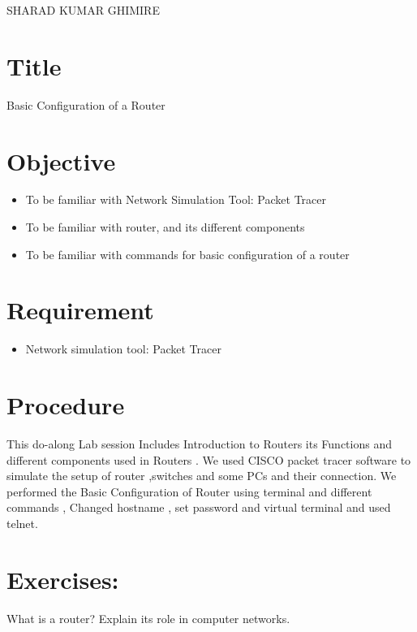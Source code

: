 \documentclass[12pt]{article}
\begin{document}
{SHARAD KUMAR GHIMIRE}

\renewcommand{\contentsname}{Table of Contents}
\tableofcontents

\pagebreak
\lstlistoflistings
\pagebreak
{}

\section{Title} {\large Basic Configuration of a Router}
\section{Objective}
\begin{itemize}
      \item To be familiar with Network Simulation Tool: Packet Tracer
      \item To be familiar with router, and its different components
      \item To be familiar with commands for basic configuration of a router
\end{itemize}
\section{Requirement}
\begin{itemize}
      \item Network simulation tool: Packet Tracer
\end{itemize}

\section{Procedure}
This do-along Lab session Includes Introduction to Routers its Functions and different components used in Routers . We used CISCO packet tracer software to simulate the setup of router ,switches and some PCs and their connection. We performed the Basic Configuration of Router using terminal and different commands , Changed hostname , set password and virtual terminal and used telnet.


\pagebreak
\section{Exercises:}
\begin{Q}
      {
            What is a router? Explain its role in computer networks.
      }
\end{Q}
\end{document}
